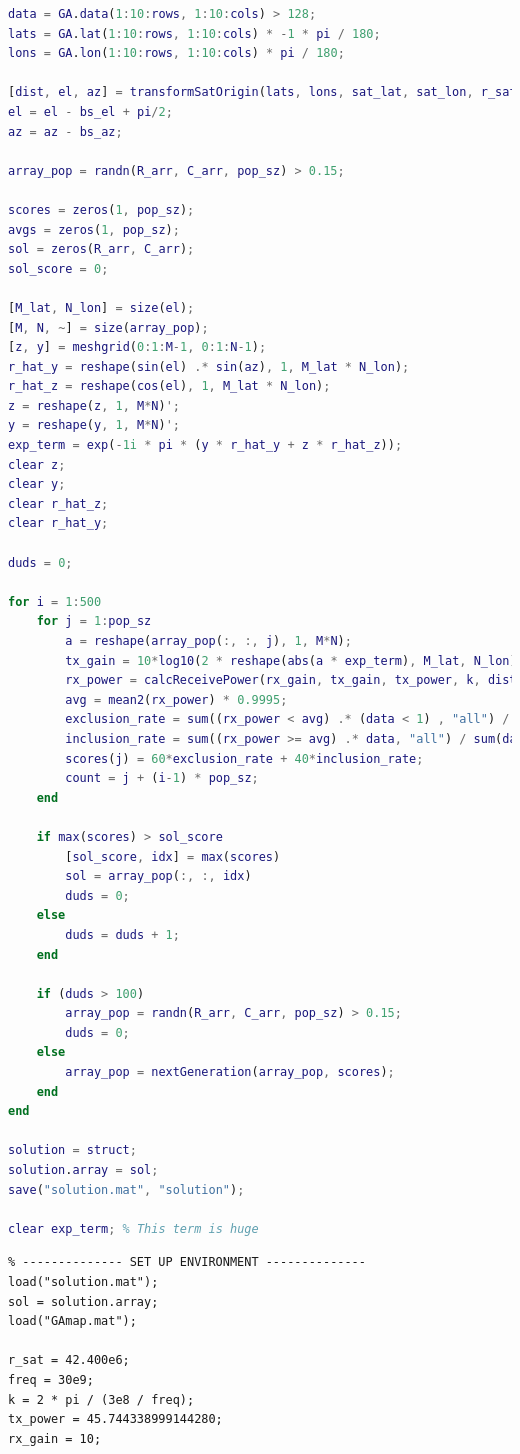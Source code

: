 \documentclass[12pt]{article}
\begin{document}
\begin{enumerate}
\begin{lstlisting}[language=matlab]
data = GA.data(1:10:rows, 1:10:cols) > 128;
lats = GA.lat(1:10:rows, 1:10:cols) * -1 * pi / 180;
lons = GA.lon(1:10:rows, 1:10:cols) * pi / 180; 

[dist, el, az] = transformSatOrigin(lats, lons, sat_lat, sat_lon, r_sat);
el = el - bs_el + pi/2;
az = az - bs_az;

array_pop = randn(R_arr, C_arr, pop_sz) > 0.15;

scores = zeros(1, pop_sz);
avgs = zeros(1, pop_sz);
sol = zeros(R_arr, C_arr);
sol_score = 0;

[M_lat, N_lon] = size(el);
[M, N, ~] = size(array_pop);
[z, y] = meshgrid(0:1:M-1, 0:1:N-1);
r_hat_y = reshape(sin(el) .* sin(az), 1, M_lat * N_lon);
r_hat_z = reshape(cos(el), 1, M_lat * N_lon);
z = reshape(z, 1, M*N)';
y = reshape(y, 1, M*N)';
exp_term = exp(-1i * pi * (y * r_hat_y + z * r_hat_z));
clear z;
clear y;
clear r_hat_z;
clear r_hat_y;

duds = 0;

for i = 1:500
    for j = 1:pop_sz
        a = reshape(array_pop(:, :, j), 1, M*N);
        tx_gain = 10*log10(2 * reshape(abs(a * exp_term), M_lat, N_lon).^2); % 2 = directivity/gain of half-space radiating element
        rx_power = calcReceivePower(rx_gain, tx_gain, tx_power, k, dist);
        avg = mean2(rx_power) * 0.9995;
        exclusion_rate = sum((rx_power < avg) .* (data < 1) , "all") / sum(data < 1, "all");
        inclusion_rate = sum((rx_power >= avg) .* data, "all") / sum(data, "all");
        scores(j) = 60*exclusion_rate + 40*inclusion_rate;
        count = j + (i-1) * pop_sz;
    end
    
    if max(scores) > sol_score
        [sol_score, idx] = max(scores)
        sol = array_pop(:, :, idx)
        duds = 0;
    else
        duds = duds + 1;
    end
    
    if (duds > 100)
        array_pop = randn(R_arr, C_arr, pop_sz) > 0.15;
        duds = 0;
    else
        array_pop = nextGeneration(array_pop, scores);
    end
end

solution = struct;
solution.array = sol;
save("solution.mat", "solution");

clear exp_term; % This term is huge
    \end{lstlisting}

    \begin{lstlisting}
% -------------- SET UP ENVIRONMENT --------------
load("solution.mat");
sol = solution.array;
load("GAmap.mat");

r_sat = 42.400e6;
freq = 30e9;
k = 2 * pi / (3e8 / freq);
tx_power = 45.744338999144280;
rx_gain = 10;


\end{lstlisting}
\end{enumerate}
\end{document}
